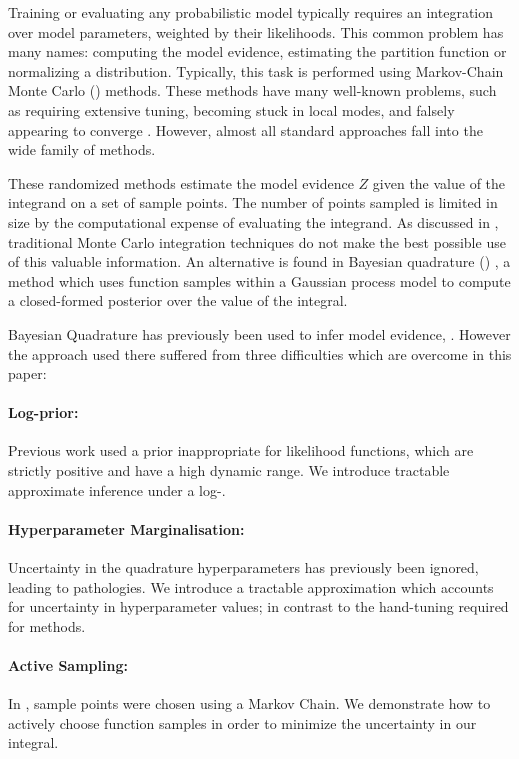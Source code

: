 \documentclass{article}
\begin{document}
Training or evaluating any probabilistic model typically requires an integration over model parameters, weighted by their likelihoods.  This common problem has many names:  computing the model evidence, estimating the partition function or normalizing a distribution.  Typically, this task is performed using Markov-Chain Monte Carlo () methods.  These methods have many well-known problems, such as requiring extensive tuning, becoming stuck in local modes, and falsely appearing to converge \citep{NealMC}.  However, almost all standard approaches fall into the wide family of  methods.

These randomized methods estimate the model evidence $Z$ given the value of the integrand on a set of sample points.  The number of points sampled is limited in size by the computational expense of evaluating the integrand. As discussed in \citep{MCUnsound}, traditional Monte Carlo integration techniques do not make the best possible use of this valuable information. An alternative is found in Bayesian quadrature () \citep{BZHermiteQuadrature}, a method which uses function samples within a Gaussian process model to compute a closed-formed posterior over the value of the integral.

Bayesian Quadrature has previously been used to infer model evidence, \citep{BZMonteCarlo}.  However the approach used there suffered from three difficulties which are overcome in this paper: 

\paragraph*{Log-prior:} Previous work used a \gpb prior inappropriate for likelihood functions, which are strictly positive and have a high dynamic range.  We introduce tractable approximate inference under a log-\gp.

\paragraph*{Hyperparameter Marginalisation:} Uncertainty in the quadrature hyperparameters has previously been ignored, leading to pathologies.  We introduce a tractable approximation which accounts for uncertainty in hyperparameter values; in contrast to the hand-tuning required for  methods.

\paragraph*{Active Sampling:} In \citep{BZMonteCarlo}, sample points were chosen using a Markov Chain.  We demonstrate how to actively choose function samples in order to minimize the uncertainty in our integral.
\end{document}
